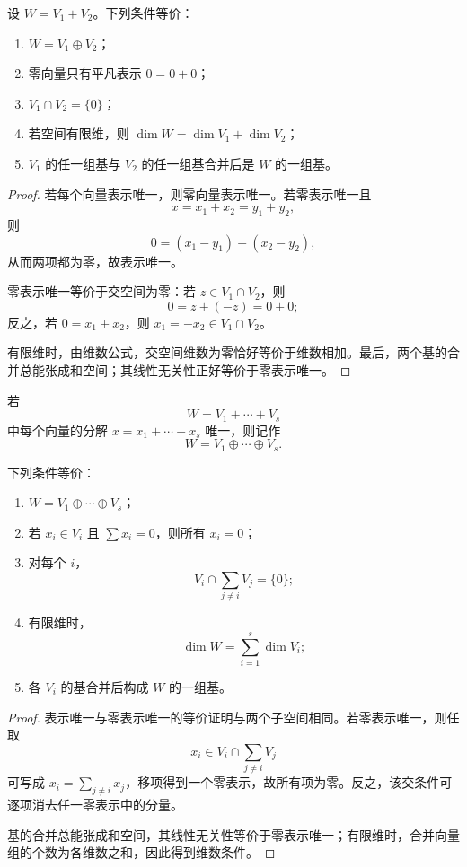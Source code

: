 \begin{theorem}[两个子空间直和的等价条件]
设 $W=V_1+V_2$。下列条件等价：
\begin{enumerate}
\item $W=V_1\oplus V_2$；
\item 零向量只有平凡表示 $0=0+0$；
\item $V_1\cap V_2=\{0\}$；
\item 若空间有限维，则 $\dim W=\dim V_1+\dim V_2$；
\item $V_1$ 的任一组基与 $V_2$ 的任一组基合并后是 $W$ 的一组基。
\end{enumerate}
\end{theorem}
\begin{proof}
若每个向量表示唯一，则零向量表示唯一。若零表示唯一且
\[
x=x_1+x_2=y_1+y_2,
\]
则
\[
0=(x_1-y_1)+(x_2-y_2),
\]
从而两项都为零，故表示唯一。

零表示唯一等价于交空间为零：若 $z\in V_1\cap V_2$，则
\[
0=z+(-z)=0+0;
\]
反之，若 $0=x_1+x_2$，则 $x_1=-x_2\in V_1\cap V_2$。

有限维时，由维数公式，交空间维数为零恰好等价于维数相加。最后，两个基的合并总能张成和空间；其线性无关性正好等价于零表示唯一。
\end{proof}

\begin{definition}[多个子空间的直和]
若
\[
W=V_1+\cdots+V_s
\]
中每个向量的分解 $x=x_1+\cdots+x_s$ 唯一，则记作
\[
W=V_1\oplus\cdots\oplus V_s.
\]
\end{definition}

\begin{theorem}[多个子空间直和的判据]
下列条件等价：
\begin{enumerate}
\item $W=V_1\oplus\cdots\oplus V_s$；
\item 若 $x_i\in V_i$ 且 $\sum x_i=0$，则所有 $x_i=0$；
\item 对每个 $i$，
\[
V_i\cap\sum_{j\ne i}V_j=\{0\};
\]
\item 有限维时，
\[
\dim W=\sum_{i=1}^s\dim V_i;
\]
\item 各 $V_i$ 的基合并后构成 $W$ 的一组基。
\end{enumerate}
\end{theorem}
\begin{proof}
表示唯一与零表示唯一的等价证明与两个子空间相同。若零表示唯一，则任取
\[
x_i\in V_i\cap\sum_{j\ne i}V_j
\]
可写成 $x_i=\sum_{j\ne i}x_j$，移项得到一个零表示，故所有项为零。反之，该交条件可逐项消去任一零表示中的分量。

基的合并总能张成和空间，其线性无关性等价于零表示唯一；有限维时，合并向量组的个数为各维数之和，因此得到维数条件。
\end{proof}

